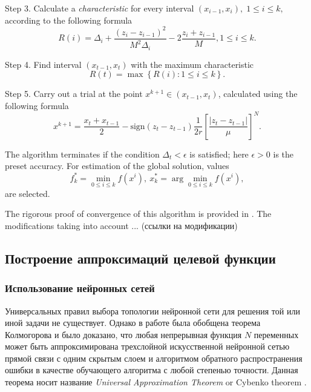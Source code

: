 \documentclass[sensors,article,submit,moreauthors,pdftex]{Definitions/mdpi}
\begin{document}
Step 3. Calculate a \textit{characteristic} for every interval $(x_{i-1}, x_i), \; 1\leq i \leq k,$   according to the following formula
\begin{equation}\label{R}
R(i)=\Delta_i+\frac{(z_i-z_{i-1})^2}{M^2\Delta_i}-2\frac{z_i+z_{i-1}}{M},1 \leq i \leq k.
\end{equation}

Step 4. Find interval $(x_{t-1},x_t)$ with the maximum characteristic
\begin{equation}\label{MaxR}
R(t)=\max{\left\{R(i): 1 \leq i \leq k \right\}}.
\end{equation}

Step 5. Carry out a trial at the point $x^{k+1}\in(x_{t-1},x_t)$, calculated using the following formula
\begin{equation}\label{NewX}
x^{k+1} = \frac{x_t+x_{t-1}}{2} - \mathrm{sign}(z_t-z_{t-1})\frac{1}{2r}\left[\frac{\left|z_t-z_{t-1}\right|}{\mu}\right]^N.
\end{equation}

The algorithm terminates if the condition $\Delta_t<\epsilon$ is satisfied; here $\epsilon>0$ is the preset accuracy. For estimation of the global solution, values
\[
f_k^\ast=\min_{0\leq i \leq k}f(x^i), \ x_k^\ast=\arg \min_{0\leq i \leq k}f(x^i),
\]
are selected.

The rigorous proof of convergence of this algorithm is provided in \cite{Strongin2000}. The modifications taking into account ... (ссылки на модификации) 

\subsection{Построение аппроксимаций целевой функции}

\subsubsection{Использование нейронных сетей}

Универсальных правил выбора топологии нейронной сети для решения той или иной задачи не существует. Однако в работе \cite{Cybenko1989} была обобщена теорема Колмогорова и было доказано, что любая непрерывная функция $N$ переменных может быть аппроксимирована трехслойной искусственной нейронной сетью прямой связи с одним скрытым слоем и алгоритмом обратного распространения ошибки в качестве обучающего алгоритма с любой степенью точности. Данная теорема носит название \textit{Universal Approximation Theorem} or Cybenko theorem \cite{Hassoun1995}.
\end{document}
